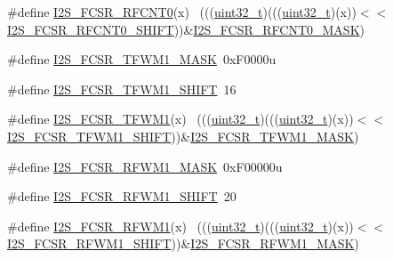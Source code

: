 \begin{DoxyCompactItemize}
\#define \hyperlink{group___i2_s___register___masks_ga1063e46731a27c3f17a4c41c1832678d}{I2\+S\+\_\+\+F\+C\+S\+R\+\_\+\+R\+F\+C\+N\+T0}(x)                                          ~(((\hyperlink{_p_e___types_8h_a33594304e786b158f3fb30289278f5af}{uint32\+\_\+t})(((\hyperlink{_p_e___types_8h_a33594304e786b158f3fb30289278f5af}{uint32\+\_\+t})(x))$<$$<$\hyperlink{group___i2_s___register___masks_gae7fe6541dbfc69a78642e31d00a00c8a}{I2\+S\+\_\+\+F\+C\+S\+R\+\_\+\+R\+F\+C\+N\+T0\+\_\+\+S\+H\+I\+FT}))\&\hyperlink{group___i2_s___register___masks_gaeef8059aa847e9a068dcaa2f2ee2c05f}{I2\+S\+\_\+\+F\+C\+S\+R\+\_\+\+R\+F\+C\+N\+T0\+\_\+\+M\+A\+SK})
\item 
\#define \hyperlink{group___i2_s___register___masks_gaf084ca22db315871ff9d069708d54fd0}{I2\+S\+\_\+\+F\+C\+S\+R\+\_\+\+T\+F\+W\+M1\+\_\+\+M\+A\+SK}~0x\+F0000u
\item 
\#define \hyperlink{group___i2_s___register___masks_gaaf529b5ca3435f838bf49dc1ab9fe475}{I2\+S\+\_\+\+F\+C\+S\+R\+\_\+\+T\+F\+W\+M1\+\_\+\+S\+H\+I\+FT}~16
\item 
\#define \hyperlink{group___i2_s___register___masks_ga1e179ede1425765944643c607a113b68}{I2\+S\+\_\+\+F\+C\+S\+R\+\_\+\+T\+F\+W\+M1}(x)                                            ~(((\hyperlink{_p_e___types_8h_a33594304e786b158f3fb30289278f5af}{uint32\+\_\+t})(((\hyperlink{_p_e___types_8h_a33594304e786b158f3fb30289278f5af}{uint32\+\_\+t})(x))$<$$<$\hyperlink{group___i2_s___register___masks_gaaf529b5ca3435f838bf49dc1ab9fe475}{I2\+S\+\_\+\+F\+C\+S\+R\+\_\+\+T\+F\+W\+M1\+\_\+\+S\+H\+I\+FT}))\&\hyperlink{group___i2_s___register___masks_gaf084ca22db315871ff9d069708d54fd0}{I2\+S\+\_\+\+F\+C\+S\+R\+\_\+\+T\+F\+W\+M1\+\_\+\+M\+A\+SK})
\item 
\#define \hyperlink{group___i2_s___register___masks_ga92ba6b94d84fae29a365f6904985995d}{I2\+S\+\_\+\+F\+C\+S\+R\+\_\+\+R\+F\+W\+M1\+\_\+\+M\+A\+SK}~0x\+F00000u
\item 
\#define \hyperlink{group___i2_s___register___masks_ga5b0b1f1f93eb11d27773034e16c05451}{I2\+S\+\_\+\+F\+C\+S\+R\+\_\+\+R\+F\+W\+M1\+\_\+\+S\+H\+I\+FT}~20
\item 
\#define \hyperlink{group___i2_s___register___masks_gaa7a537a7b0f5ee356021537e3dfb1db3}{I2\+S\+\_\+\+F\+C\+S\+R\+\_\+\+R\+F\+W\+M1}(x)                                            ~(((\hyperlink{_p_e___types_8h_a33594304e786b158f3fb30289278f5af}{uint32\+\_\+t})(((\hyperlink{_p_e___types_8h_a33594304e786b158f3fb30289278f5af}{uint32\+\_\+t})(x))$<$$<$\hyperlink{group___i2_s___register___masks_ga5b0b1f1f93eb11d27773034e16c05451}{I2\+S\+\_\+\+F\+C\+S\+R\+\_\+\+R\+F\+W\+M1\+\_\+\+S\+H\+I\+FT}))\&\hyperlink{group___i2_s___register___masks_ga92ba6b94d84fae29a365f6904985995d}{I2\+S\+\_\+\+F\+C\+S\+R\+\_\+\+R\+F\+W\+M1\+\_\+\+M\+A\+SK})
$$
\end{DoxyCompactItemize}
